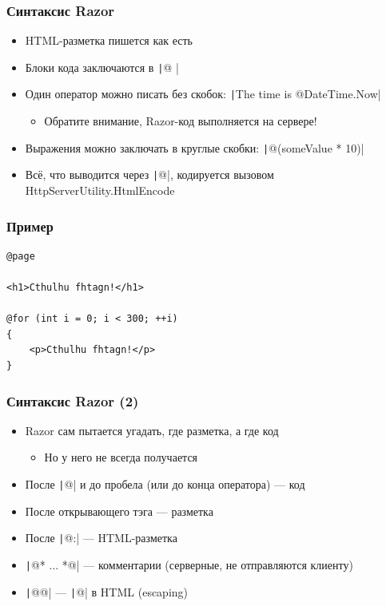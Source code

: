 \documentclass[xetex,mathserif,serif]{beamer}
\begin{document}
    \begin{frame}
        \frametitle{Синтаксис Razor}
        \begin{itemize}
            \item HTML-разметка пишется как есть
            \item Блоки кода заключаются в \texttt|@{ }|
            \item Один оператор можно писать без скобок: \texttt|The time is @DateTime.Now|
            \begin{itemize}
                \item Обратите внимание, Razor-код выполняется на сервере!
            \end{itemize}
            \item Выражения можно заключать в круглые скобки: \texttt|@(someValue * 10)|
            \item Всё, что выводится через \texttt|@|, кодируется вызовом HttpServerUtility.HtmlEncode
        \end{itemize}
    \end{frame}

    \begin{frame}[fragile]
        \frametitle{Пример}
        \begin{verbatim}
@page

<h1>Cthulhu fhtagn!</h1>

@for (int i = 0; i < 300; ++i)
{
    <p>Cthulhu fhtagn!</p>
}
        \end{verbatim}
    \end{frame}

    \begin{frame}
        \frametitle{Синтаксис Razor (2)}
        \begin{itemize}
            \item Razor сам пытается угадать, где разметка, а где код
            \begin{itemize}
                \item Но у него не всегда получается
            \end{itemize}
            \item После \texttt|@| и до пробела (или до конца оператора) --- код
            \item После открывающего тэга --- разметка
            \item После \texttt|@:| --- HTML-разметка
            \item \texttt|@* ... *@| --- комментарии (серверные, не отправляются клиенту)
            \item \texttt|@@| --- \texttt|@| в HTML (escaping)
        \end{itemize}
    \end{frame}
\end{document}

